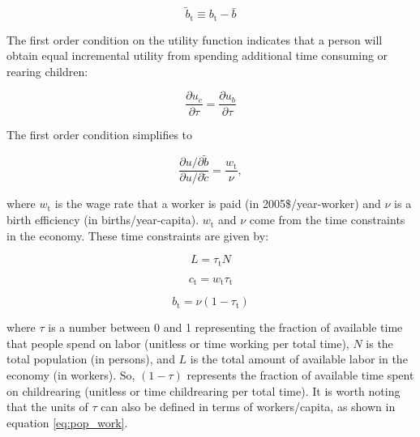 \documentclass[letterpaper,12pt]{article}
\begin{document}
\begin{equation} \label{eq:b_tilde}
	\tilde b_\mathrm{t} \equiv b_\mathrm{t} - \bar b
\end{equation}

The first order condition on the utility function indicates that a person will obtain equal incremental utility from spending additional time consuming or rearing children:

\begin{equation} \label{eq:first_order_condition_def}
	\frac{\partial u_{c}}{\partial \tau} = \frac{\partial u_{b}}{\partial \tau}
\end{equation}

\noindent The first order condition simplifies to 

\begin{equation} \label{eq:first_order_condition_simplified}
	\frac{\partial u/ \partial\tilde b}{\partial u/ \partial\tilde c} = \frac{w_\mathrm{t}}{\nu},
\end{equation}

\noindent where $w_\mathrm{t}$ is the wage rate that a worker is paid (in 2005\$/year-worker) and $\nu$ is a birth efficiency (in births/year-capita). $w_\mathrm{t}$ and $\nu$ come from the time constraints in the economy. These time constraints are given by:

\begin{equation}\label{eq:pop_work}
	L = \tau_\mathrm{t} N
\end{equation}

\begin{equation} \label{eq:consumption_constraint}
	c_\mathrm{t} = w_\mathrm{t} \tau_\mathrm{t}
\end{equation}

\begin{equation} \label{eq:birth_constraint}
	b_\mathrm{t} = \nu (1-\tau_\mathrm{t})
\end{equation}

\noindent where $\tau$ is a number between 0 and 1 representing the fraction of available time that people spend on labor (unitless or time working per total time), $N$ is the total population (in persons), and $L$ is the total amount of available labor in the economy (in workers). So, $(1-\tau)$ represents the fraction of available time spent on childrearing (unitless or time childrearing per total time). It is worth noting that the units of $\tau$ can also be defined in terms of workers/capita, as shown in equation \ref{eq:pop_work}.
\end{document}
